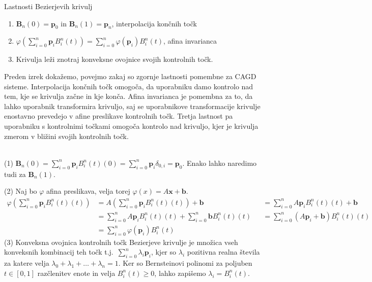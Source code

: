 \documentclass[isrm2, tisk]{fmfdelo}
\newcommand{\p}{\textbf{p}}
\newcommand{\lilb}[2]{B_{#1}^{#2}(t)}
\newcommand{\bigbbod}[2]{\textbf{B}_{#1}(#2)}
\newcommand{\bernsteinsump}[2]{\sum_{#1=0}^{#2} \p_{#1}\lilb{#1}{#2}}
\newcommand{\bernsteinsumtritri}[3]{\sum_{#1=0}^{#2} #3\lilb{#1}{#2}}
\begin{document}
    \begin{izrek}{Lastnosti Bezierjevih krivulj}
        \label{izrek:lastnosti-bezierjevih-krivulj}
        \begin{enumerate}
            \item $\bigbbod{n}{0}=\p_0$ in $\bigbbod{n}{1}=\p_n$, interpolacija končnih točk
            \item $\varphi(\bernsteinsump{i}{n}) =\bernsteinsumtritri{i}{n}{\varphi(\p_i)}$, afina invarianca
            \item Krivulja leži znotraj konveksne ovojnice svojih kontrolnih točk.
        \end{enumerate}
    \end{izrek}
    Preden izrek dokažemo, povejmo zakaj so zgornje lastnosti pomembne za CAGD sisteme.
    Interpolacija končnih točk omogoča, da uporabniku damo kontrolo nad tem, kje se krivulja začne in kje konča.
    Afina invarianca je pomembna za to, da lahko uporabnik transformira krivuljo, saj se uporabnikove transformacije krivulje enostavno prevedejo v afine preslikave kontrolnih točk.
    Tretja lastnost pa uporabniku s kontrolnimi točkami omogoča kontrolo nad krivuljo, kjer je krivulja zmerom v bližini svojih kontrolnih točk.
    \begin{dokaz}
        ~\\
        \noindent (1) $\bigbbod{n}{0}=\sum_{i=0}^{n}\p_{i}B_i^n(t)(0) = \sum_{i=0}^{n}\p_{i}\delta_{0,i} = \p_0$.
        Enako lahko naredimo tudi za $\bigbbod{n}{1}.$

        \noindent (2) Naj bo $\varphi$ afina preslikava, velja torej $\varphi(x) = A\mathbf{x} + \mathbf{b}.$
        \begin{align*}
            \varphi\left(\sum_{i=0}^{n}\p_{i}B_i^n(t)(t)\right) &= A\left(\sum_{i=0}^{n}\p_{i}B_i^n(t)(t)\right) + \mathbf{b} &&=  \sum_{i=0}^{n}A\p_{i}B_i^n(t)(t) + \mathbf{b}  \\
            &= \sum_{i=0}^{n}A\p_{i}B_i^n(t)(t) + \sum_{i=0}^{n}\mathbf{b}B_i^n(t)(t) &&= \sum_{i=0}^{n}(A\p_{i}+\mathbf{b})B_i^n(t)(t) \\
            &= \bernsteinsumtritri{i}{n}{\varphi(\p_i)}
        \end{align*}
        \noindent (3) Konveksna ovojnica kontrolnih točk Bezierjeve krivulje je množica vseh konveksnih kombinacij teh točk t.j.\ $\sum_{i=0}^{n}\lambda_i\p_{i}$, kjer so $\lambda_i$ pozitivna realna števila za katere velja $\lambda_0 + \lambda_1 + \dots + \lambda_n = 1$.
        Ker so Bernsteinovi polinomi za poljuben $t\in[0,1]$ razčlenitev enote in velja $B_i^n(t)\geq0$, lahko zapišemo $\lambda_i=B_i^n(t)$.
    \end{dokaz}
\end{document}
